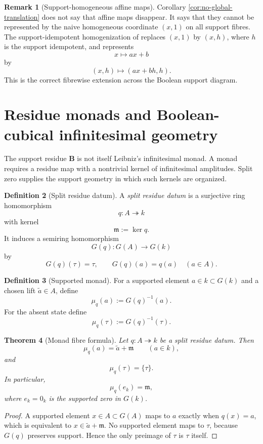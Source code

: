 \documentclass[11pt]{amsart}
\numberwithin{equation}{section}
\newtheorem{theorem}{Theorem}[section]
\theoremstyle{definition}
\newtheorem{definition}[theorem]{Definition}
\newtheorem{remark}[theorem]{Remark}
\newcommand{\B}{\mathbf B}
\begin{document}
\begin{remark}[Support-homogeneous affine maps]
Corollary \ref{cor:no-global-translation} does not say that affine maps disappear.  It says that they cannot be represented by the naive homogeneous coordinate $(x,1)$ on all support fibres.  The support-idempotent homogenization of \cite{Homogenization} replaces $(x,1)$ by $(x,h)$, where $h$ is the support idempotent, and represents
\[
x\longmapsto ax+b
\]
by
\[
(x,h)\longmapsto(ax+bh,h).
\]
This is the correct fibrewise extension across the Boolean support diagram.
\end{remark}

\section{Residue monads and Boolean-cubical infinitesimal geometry}

The support residue $\B$ is not itself Leibniz's infinitesimal monad.  A monad requires a residue map with a nontrivial kernel of infinitesimal amplitudes.  Split zero supplies the support geometry in which such kernels are organized.

\begin{definition}[Split residue datum]\label{def:split-residue-datum}
A \emph{split residue datum} is a surjective ring homomorphism
\[
q:A\twoheadrightarrow k
\]
with kernel
\[
\mathfrak m:=\ker q.
\]
It induces a semiring homomorphism
\[
G(q):G(A)\longrightarrow G(k)
\]
by
\[
G(q)(\tau)=\tau,
\qquad
G(q)(a)=q(a)
\quad(a\in A).
\]
\end{definition}

\begin{definition}[Supported monad]
For a supported element $a\in k\subset G(k)$ and a chosen lift $\widetilde a\in A$, define
\[
\mu_q(a):=G(q)^{-1}(a).
\]
For the absent state define
\[
\mu_q(\tau):=G(q)^{-1}(\tau).
\]
\end{definition}

\begin{theorem}[Monad fibre formula]\label{thm:monad-fibre}
Let $q:A\twoheadrightarrow k$ be a split residue datum.  Then
\[
\mu_q(a)=\widetilde a+\mathfrak m
\qquad(a\in k),
\]
and
\[
\mu_q(\tau)=\{\tau\}.
\]
In particular,
\[
\mu_q(e_k)=\mathfrak m,
\]
where $e_k=0_k$ is the supported zero in $G(k)$.
\end{theorem}

\begin{proof}
A supported element $x\in A\subset G(A)$ maps to $a$ exactly when $q(x)=a$, which is equivalent to $x\in\widetilde a+\mathfrak m$.  No supported element maps to $\tau$, because $G(q)$ preserves support.  Hence the only preimage of $\tau$ is $\tau$ itself.
\end{proof}
\end{document}
